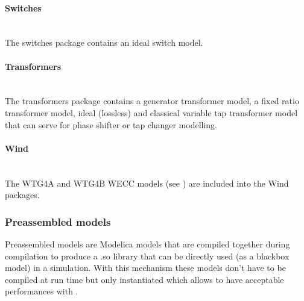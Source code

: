 \documentclass[a4paper, 12pt]{report}
\begin{document}
\paragraph{Switches}
~~\\

The switches package contains an ideal switch model.

\paragraph{Transformers}
~~\\

The transformers package contains a generator transformer model, a fixed ratio transformer model, ideal (lossless) and classical variable tap transformer model that can serve for phase shifter or tap changer modelling.

\paragraph{Wind}
~~\\

The WTG4A and WTG4B \ac{WECC} models (see \cite{WECC}) are included into the Wind packages.

\subsubsection{Preassembled models}

Preassembled models are Modelica models that are compiled together during \Dynawo compilation to produce a .so library that can be directly used (as a blackbox model) in a simulation. With this mechanism these models don't have to be compiled at run time but only instantiated which allows to have acceptable performances with \Dynawo. \\
\end{document}
